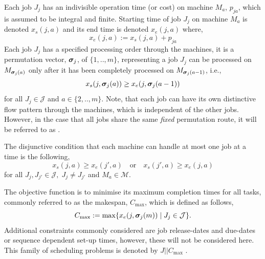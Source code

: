 \documentclass[smallextended]{svjour3}
\begin{document}
Each job $J_j$ has an indivisible operation time (or cost) on machine $M_a$, 
$p_{ja}$, which is assumed to be integral and finite. 
Starting time of job $J_j$ on machine $M_a$ is denoted $x_s(j,a)$ and its 
end time is denoted $x_e(j,a)$ where, 
\begin{equation}  x_e(j,a):=x_s(j,a)+p_{ja} \end{equation} 
Each job $J_j$ has a specified processing order through the machines, it is a 
permutation vector, $\bm \sigma_j$, of $\{1,..,m\}$, representing a job $J_j$ can 
be processed on $M_{\bm \sigma_j(a)}$ only after it has been completely processed 
on $M_{\bm \sigma_j(a-1)}$, i.e.,
\begin{equation}\label{eq:permutation}
x_s(j,\bm \sigma_j(a)) \geq x_e(j,\bm \sigma_j(a-1)) 
\end{equation}
for all $J_j\in\mathcal{J}$ and $a\in\{2,..,m\}$. 
Note, that each job can have its own distinctive flow pattern through the 
machines, which is independent of the other jobs. However, in the case that all 
jobs share the same \emph{fixed} permutation route, it will be referred to as 
\FSP.

The disjunctive condition that each machine can handle at most one job at a 
time is the following,
\begin{equation}\label{eq:oneJobPerMac}
x_s(j,a) \geq x_e(j',a) \quad\textrm{or}\quad x_s(j',a) \geq x_e(j,a)  
\end{equation}
for all $J_j,J_{j'}\in\mathcal{J},\; J_j\neq J_{j'}$ and $M_a\in\mathcal{M}$. 

The objective function is to minimise its maximum completion times for all 
tasks, commonly referred to as the makespan, $C_{\max}$, which is defined as 
follows,
\begin{equation}
C_{\max} := 
\max\{x_e(j,\bm \sigma_j(m))\;|\;J_j\in\mathcal{J}\}.\label{eq:makespan}
\end{equation} 
Additional constraints commonly considered are job release-dates and due-dates 
or sequence dependent set-up times, however, these will not be considered here. 
This family of scheduling problems is denoted by $J||C_{\max}$ 
\cite{Pinedo08}.  

\end{document}
